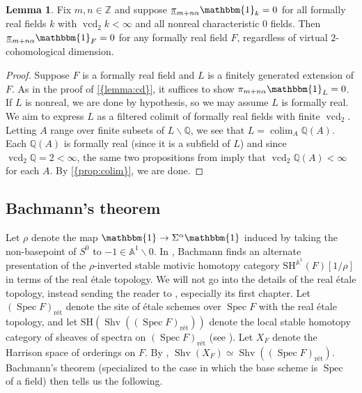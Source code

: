 \documentclass[10pt]{amsart}
\numberwithin{equation}{section}
\theoremstyle{plain}
\theoremstyle{definition}
\newtheorem{lemma}[lemma]{Lemma}
\theoremstyle{remark}
\begin{document}
\begin{lemma}\label{lemma:vcd}
Fix $m,n\in{\mathbb{Z}}$ and suppose ${\underline{\smash{\pi}}}_{m+n\alpha}{\mathbbm{1}}_k = 0$ for all formally real fields $k$ with ${\operatorname{vcd}}_2 k <\infty$ and all nonreal characteristic $0$ fields.  Then ${\underline{\smash{\pi}}}_{m+n\alpha}{\mathbbm{1}}_F = 0$ for any formally real field $F$, regardless of virtual $2$-cohomological dimension.
\end{lemma}
\begin{proof}
Suppose $F$ is a formally real field and $L$ is a finitely generated extension of $F$.  As in the proof of {\autoref{{lemma:cd}}}, it suffices to show $\pi_{m+n\alpha}{\mathbbm{1}}_L = 0$.  If $L$ is nonreal, we are done by hypothesis, so we may assume $L$ is formally real.  We aim to express $L$ as a filtered colimit of formally real fields with finite ${\operatorname{vcd}}_2$.  Letting $A$ range over finite subsets of $L\smallsetminus {\mathbb{Q}}$, we see that $L = \operatorname*{\mathrm{colim}}_A {\mathbb{Q}}(A)$.  Each ${\mathbb{Q}}(A)$ is formally real (since it is a subfield of $L$) and since ${\operatorname{vcd}}_2 {\mathbb{Q}} = 2 <\infty$, the same two propositions from \cite{serre:gc} imply that ${\operatorname{vcd}}_2 {\mathbb{Q}}(A)<\infty$ for each $A$.  By {\autoref{{prop:colim}}}, we are done.
\end{proof}

\subsection{Bachmann's theorem}\label{subsec:bachmann}

Let $\rho$ denote the map ${\mathbbm{1}}\to \Sigma^\alpha{\mathbbm{1}}$ induced by taking the non-basepoint of $S^0$ to $-1\in {\mathbb{A}}^1{\smallsetminus} 0$.  In \cite{bachmann:rho}, Bachmann finds an alternate presentation of the $\rho$-inverted stable motivic homotopy category ${\mathrm{SH}^{{\mathbb{A}}^1}\!}(F)[1/\rho]$ in terms of the real \'etale topology.  We will not go into the details of the real \'etale topology, instead sending the reader to \cite{ret}, especially its first chapter.  Let $({\operatorname{Spec}} F)_{\text{r\'et}}$ denote the site of \'etale schemes over ${\operatorname{Spec}} F$ with the real \'etale topology, and let ${\mathrm{SH}}({\operatorname{Shv}}(({\operatorname{Spec}} F)_{\text{r\'et}}))$ denote the local stable homotopy category of sheaves of spectra on $({\operatorname{Spec}} F)_{\text{r\'et}}$ (see \cite[\S 2]{bachmann:rho}).  Let $X_F$ denote the Harrison space of orderings on $F$.  By \cite[Theorem 1.3]{ret}, ${\operatorname{Shv}}(X_F)\simeq {\operatorname{Shv}}(({\operatorname{Spec}} F)_{\text{r\'et}})$.  Bachmann's theorem (specialized to the case in which the base scheme is ${\operatorname{Spec}}$ of a field) then tells us the following.
\end{document}
